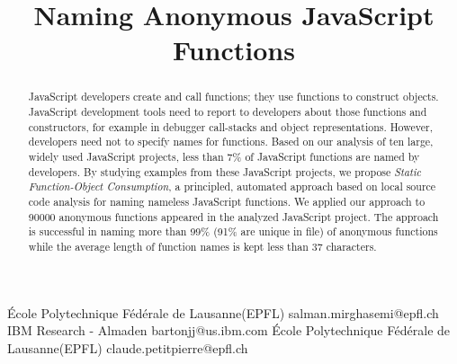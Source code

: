 \documentclass[10pt, preprint]{sigplanconf}
\begin{document}
\copyrightdata{[to be supplied]} 


\title{Naming Anonymous JavaScript Functions}

           {\'Ecole Polytechnique F\'ed\'erale de Lausanne(EPFL)}
           {salman.mirghasemi@epfl.ch}
           {IBM Research - Almaden}
           {bartonjj@us.ibm.com} 
           {\'Ecole Polytechnique F\'ed\'erale de Lausanne(EPFL)}
           {claude.petitpierre@epfl.ch}

\maketitle

\begin{abstract}
JavaScript developers create and call functions; they use functions to construct objects. JavaScript development tools need to report to developers about those functions and constructors, for example in debugger call-stacks and object representations. However, developers need not to specify names for functions.  
 Based on our analysis of ten large, widely used JavaScript projects, less than 7\% of JavaScript functions are named by developers. 
By studying examples from these JavaScript projects, we propose \textit{Static Function-Object Consumption}, a principled, automated approach based on local source code analysis for naming nameless JavaScript functions. We applied our approach to 90000 anonymous functions appeared in the analyzed JavaScript project. The approach is successful in naming more than 99\% (91\% are unique in file) of anonymous functions while the average length of function names is kept less than 37 characters.%

\end{abstract}

\end{document}
